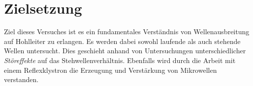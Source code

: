 \chapter{Zielsetzung}
\label{cha:zielsetzung}
Ziel dieses Versuches ist es ein fundamentales Verständnis von Wellenausbreitung auf Hohlleiter zu erlangen. Es werden dabei sowohl laufende als auch stehende Wellen untersucht. 
Dies geschieht anhand von Untersuchungen unterschiedlicher \textit{Störeffekte} auf das Stehwellenverhältnis. Ebenfalls wird durch die Arbeit mit einem Reflexklystron die Erzeugung 
und Verstärkung von Mikrowellen verstanden.